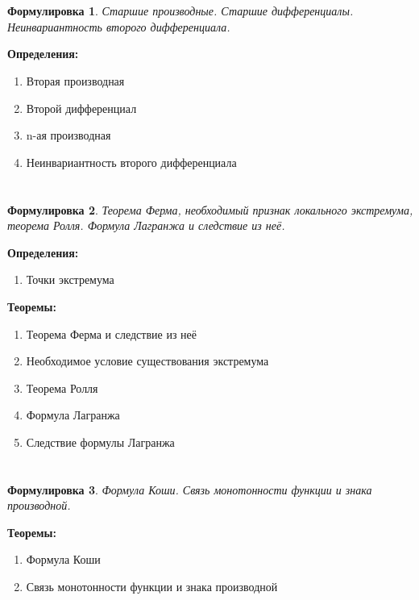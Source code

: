 \documentclass[a4paper]{article}
\theoremstyle{plain}
\newtheorem*{st}{Формулировка}
\theoremstyle{definition}
\theoremstyle{remark}
\begin{document}
\section{}
\begin{st}
    Старшие производные. Старшие дифференциалы. Неинвариантность второго дифференциала.
\end{st}

\textbf{Определения:}
\begin{enumerate}
    \item Вторая производная
    \item Второй дифференциал
    \item n-ая производная
    \item Неинвариантность второго дифференциала
\end{enumerate}


\section{}
\begin{st}
    Теорема Ферма, необходимый признак локального экстремума, теорема Ролля. Формула Лагранжа и следствие из неё.
\end{st}

\textbf{Определения:}
\begin{enumerate}
    \item Точки экстремума
\end{enumerate}

\textbf{Теоремы:}
\begin{enumerate}
    \item Теорема Ферма и следствие из неё
    \item Необходимое условие существования экстремума
    \item Теорема Ролля
    \item Формула Лагранжа
    \item Следствие формулы Лагранжа
\end{enumerate}


\section{}
\begin{st}
    Формула Коши. Связь монотонности функции и знака производной.
\end{st}

\textbf{Теоремы:}
\begin{enumerate}
    \item Формула Коши
    \item Связь монотонности функции и знака производной
\end{enumerate}
\end{document}
